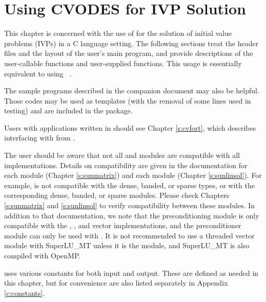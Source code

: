 \chapter{Using CVODES for IVP Solution}\label{s:simulation}

This chapter is concerned with the use of {\cvodes} for the solution of
initial value problems (IVPs) in a C language setting.  The following
sections treat the header files and the layout of the user's main
program, and provide descriptions of the {\cvodes} user-callable
functions and user-supplied functions.
This usage is essentially equivalent to using {\cvode}~\cite{cvode_ug}.

The sample programs described in the companion document \cite{cvodes_ex}
may also be helpful.  Those codes may be used as templates (with the removal
of some lines used in testing) and are included in the {\cvodes} package.

Users with applications written in {\F} should see Chapter \ref{s:cvfort},
which describes interfacing with {\cvodes} from {\F}.

The user should be aware that not all {\sunlinsol} and {\sunmatrix}
modules are compatible with all {\nvector} implementations.
Details on compatibility are given in the documentation for each
{\sunmatrix} module (Chapter \ref{s:sunmatrix}) and each {\sunlinsol}
module (Chapter \ref{s:sunlinsol}). For example, {\nvecp} is not
compatible with the dense, banded, or sparse {\sunmatrix} types, or with
the corresponding dense, banded, or sparse {\sunlinsol} modules.  Please
check Chapters \ref{s:sunmatrix} and \ref{s:sunlinsol} to verify
compatibility between these modules.  In addition to that
documentation, we note that the {\cvbandpre} preconditioning module is
only compatible with the {\nvecs}, {\nvecopenmp}, and {\nvecpthreads}
vector implementations, and the preconditioner module {\cvbbdpre}
can only be used with {\nvecp}.
It is not recommended to use a threaded vector module with SuperLU\_MT
unless it is the {\nvecopenmp} module, and SuperLU\_MT is also compiled
with OpenMP.

{\cvodes} uses various constants for both input and output.  These are
defined as needed in this chapter, but for convenience are also listed
separately in Appendix \ref{c:constants}.

